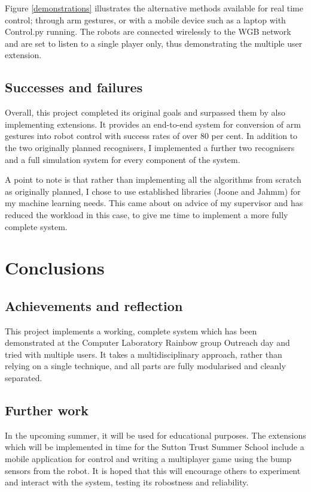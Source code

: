 \documentclass[12pt,a4,notitlepage]{report}
\renewcommand{\_}{\texttt{\symbol{95}}}
\newcommand{\<}{\texttt{\symbol{60}}}
\renewcommand{\>}{\texttt{\symbol{62}}}
\begin{document}
Figure \ref{demonstrations} illustrates the alternative methods available for real time control; through arm gestures, or with a mobile device such as a laptop with Control.py running. The robots are connected wirelessly to the WGB network and are set to listen to a single player only, thus demonstrating the multiple user extension.

\section{Successes and failures}

Overall, this project completed its original goals and surpassed them by also implementing extensions. It provides an end-to-end system for conversion of arm gestures into robot control with success rates of over 80 per cent. In addition to the two originally planned recognisers, I implemented a further two recognisers and a full simulation system for every component of the system.

A point to note is that rather than implementing all the algorithms from scratch as originally planned, I chose to use established libraries (Joone and Jahmm) for my machine learning needs. This came about on advice of my supervisor and has reduced the workload in this case, to give me time to implement a more fully complete system.

\chapter{Conclusions}

\section{Achievements and reflection}

This project implements a working, complete system which has been demonstrated at the Computer Laboratory Rainbow group Outreach day and tried with multiple users. It takes a multidisciplinary approach, rather than relying on a single technique, and all parts are fully modularised and cleanly separated.

\section{Further work}

In the upcoming summer, it will be used for educational purposes. The extensions which will be implemented in time for the Sutton Trust Summer School include a mobile application for control and writing a multiplayer game using the bump sensors from the robot. It is hoped that this will encourage others to experiment and interact with the system, testing its robostness and reliability.
\end{document}

